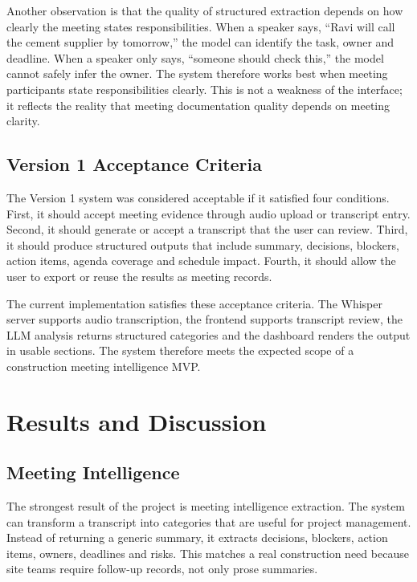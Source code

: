 \documentclass[11pt,a4paper]{article}
\begin{document}
Another observation is that the quality of structured extraction depends on how clearly the meeting states responsibilities. When a speaker says, ``Ravi will call the cement supplier by tomorrow,'' the model can identify the task, owner and deadline. When a speaker only says, ``someone should check this,'' the model cannot safely infer the owner. The system therefore works best when meeting participants state responsibilities clearly. This is not a weakness of the interface; it reflects the reality that meeting documentation quality depends on meeting clarity.

\subsection{Version 1 Acceptance Criteria}

The Version 1 system was considered acceptable if it satisfied four conditions. First, it should accept meeting evidence through audio upload or transcript entry. Second, it should generate or accept a transcript that the user can review. Third, it should produce structured outputs that include summary, decisions, blockers, action items, agenda coverage and schedule impact. Fourth, it should allow the user to export or reuse the results as meeting records.

The current implementation satisfies these acceptance criteria. The Whisper server supports audio transcription, the frontend supports transcript review, the LLM analysis returns structured categories and the dashboard renders the output in usable sections. The system therefore meets the expected scope of a construction meeting intelligence MVP.

\section{Results and Discussion}

\subsection{Meeting Intelligence}

The strongest result of the project is meeting intelligence extraction. The system can transform a transcript into categories that are useful for project management. Instead of returning a generic summary, it extracts decisions, blockers, action items, owners, deadlines and risks. This matches a real construction need because site teams require follow-up records, not only prose summaries.
\end{document}

